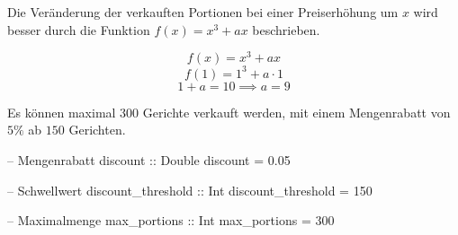 \begin{frame}
    \begin{exercise}[a)]
        Die Veränderung der verkauften Portionen bei einer Preiserhöhung um $x$ wird besser durch die Funktion $f(x) = x^3 + ax$ beschrieben.
    \end{exercise}
    \begin{solve}[a) Berechnen Sie $a$, so dass $f(1)=10$.]\vspace{-\abovedisplayskip}
        $$f(x)=x^3+ax$$
        $$f(1)=1^3+a\cdot1$$
        $$1+a=10 \implies a=9$$
    \end{solve}
\end{frame}
\addtocounter{exercise}{-1}\addtocounter{solve}{-1}%
\begin{frame}[fragile]
    \begin{exercise}[b)]
        Es können maximal $300$ Gerichte verkauft werden, mit einem Mengenrabatt von $5\%$ ab $150$ Gerichten.
    \end{exercise}
    \begin{solve}
    \vspace{-\abovedisplayskip}\begin{minipage}[t]{0.5\linewidth}
    \begin{plainhaskell}
-- Mengenrabatt
discount :: Double
discount = 0.05

-- Schwellwert
discount_threshold :: Int
discount_threshold = 150
    \end{plainhaskell}
    \end{minipage}\begin{minipage}[t]{0.5\linewidth}
    \begin{plainhaskell}
-- Maximalmenge
max_portions :: Int
max_portions = 300
    \end{plainhaskell}
    \end{minipage}
    \end{solve}
\end{frame}
\addtocounter{exercise}{-1}\addtocounter{solve}{-1}%
